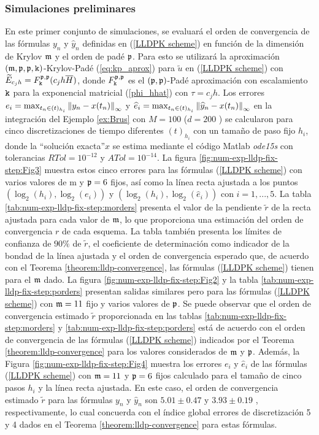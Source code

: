 \subsubsection{Simulaciones preliminares}
En este primer conjunto de simulaciones, se evaluará el orden de convergencia de las fórmulas $y_n$ y $\widehat{y}_n$ definidas en (\ref{LLDPK scheme}) en función de la dimensión de Krylov $\mathfrak{m}$ y el orden de padé $\mathfrak{p}$. Para esto se utilizará la aproximación $(\mathfrak{m},\mathfrak{p},\mathfrak{p},\mathtt{k})$-Krylov-Padé (\ref{eq:kp_aprox}) para $\widetilde{u}$ en (\ref{LLDPK scheme}) con $\widetilde{E}_{c_jh} = F_{\mathtt{k}}^{\mathfrak{p},\mathfrak{p}}(c_jh\overline{H})$, donde $F_{\mathtt{k}}^{\mathfrak{p},\mathfrak{p}}$ es el $ (\mathfrak{p},\mathfrak{p})$-Padé aproximación con escalamiento $\mathtt{k}$ para la exponencial matricial (\ref{phi_hhat}) con $\tau=c_jh$. Los errores $e_i=\max_{t_n\in(t)_{h_i}}\left\lVert y_n-x(t_n) \right\rVert_\infty$ y $\widehat{e}_i=\max_{t_n\in(t )_{h_i}}\left\lVert \widehat{y}_n-x(t_n) \right\rVert_\infty$ en la integración del Ejemplo \ref{ex:Brus} con $M=100$ ($d=200$ ) se calcularon para cinco discretizaciones de tiempo diferentes $(t)_{h_i}$ con un tamaño de paso fijo $h_i$, donde la \textquotedblleft solución exacta\textquotedblright $x$ se estima mediante el código Matlab \textit{ode15s} con tolerancias $RTol=10^{ -12}$ y $ATol=10^{-14}$. La figura \ref{fig:num-exp-lldp-fix-step:Fig3} muestra estos cinco errores para las fórmulas (\ref{LLDPK scheme}) con varios valores de m y $\mathfrak{p}=6$ fijos, así como la línea recta ajustada a los puntos $(\log_2( h_i),\log_2(e_i))$ y $(\log_2(h_i),\log_2(\widehat{e}_i))$ con $i=1,...,5$. La tabla \ref{tab:num-exp-lldp-fix-step:morders} presenta el valor de la pendiente $\widetilde{r}$ de la recta ajustada para cada valor de $\mathfrak{m}$, lo que proporciona una estimación del orden de convergencia $r$ de cada esquema. La tabla también presenta los límites de confianza de $90\%$ de $\widetilde{r}$, el coeficiente de determinación como indicador de la bondad de la línea ajustada y el orden de convergencia esperado que, de acuerdo con el Teorema \ref{theorem:lldp-convergence}, las fórmulas (\ref{LLDPK scheme}) tienen para el $\mathfrak{m}$ dado. La figura \ref{fig:num-exp-lldp-fix-step:Fig2} y la tabla \ref{tab:num-exp-lldp-fix-step:porders} presentan salidas similares pero para las fórmulas (\ref{LLDPK scheme}) con $\mathfrak{m}=11$ fijo y varios valores de $\mathfrak{p}$. Se puede observar que el orden de convergencia estimado $\widetilde{r}$ proporcionada en las tablas \ref{tab:num-exp-lldp-fix-step:morders} y \ref{tab:num-exp-lldp-fix-step:porders} está de acuerdo con el orden de convergencia de las fórmulas (\ref{LLDPK scheme}) indicados por el Teorema \ref{theorem:lldp-convergence} para los valores considerados de $\mathfrak{m}$ y $\mathfrak{p}$. Además, la Figura \ref{fig:num-exp-lldp-fix-step:Fig4} muestra los errores $e_i$ y $\widehat{e}_i$ de las fórmulas (\ref{LLDPK scheme}) con $\mathfrak{m}=11$ y $\mathfrak{p}=6$ fijos calculado para el tamaño de cinco pasos $h_i$ y la línea recta ajustada. En este caso, el orden de convergencia estimado $\widetilde{r}$ para las fórmulas $y_n$ y $\widehat{y}_n$ son $5.01 \pm 0.47$ y $3.93 \pm 0.19$ , respectivamente, lo cual concuerda con el índice global errores de discretización 5 y 4 dados en el Teorema \ref{theorem:lldp-convergence} para estas fórmulas.


